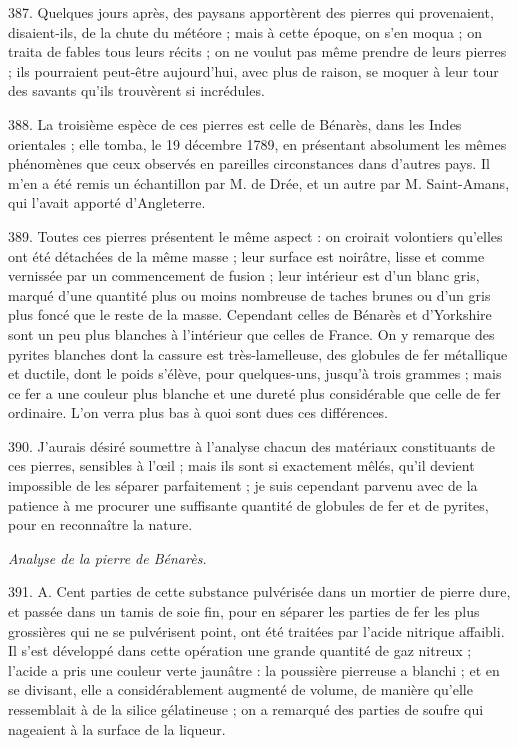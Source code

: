 \documentclass[a4paper, 11pt, oneside, polutonikogreek, french]{article}
\begin{document}
387. Quelques jours après, des paysans apportèrent des pierres qui provenaient, disaient-ils, de la chute du météore ; mais à cette époque, on s'en moqua ; on traita de fables tous leurs récits ; on ne voulut pas même prendre de leurs pierres ; ils pourraient peut-être aujourd'hui, avec plus de raison, se moquer à leur tour des savants qu'ils trouvèrent si incrédules.

388. La troisième espèce de ces pierres est celle de Bénarès, dans les Indes orientales ; elle tomba, le 19 décembre 1789, en présentant absolument les mêmes phénomènes que ceux observés en pareilles circonstances dans d'autres pays. Il m'en a été remis un échantillon par M. de Drée, et un autre par M. Saint-Amans, qui l'avait apporté d'Angleterre.

389. Toutes ces pierres présentent le même aspect : on croirait volontiers qu'elles ont été détachées de la même masse ; leur surface est noirâtre, lisse et comme vernissée par un commencement de fusion ; leur intérieur est d'un blanc gris, marqué d'une quantité plus ou moins nombreuse de taches brunes ou d'un gris plus foncé que le reste de la masse. Cependant celles de Bénarès et d'Yorkshire sont un peu plus blanches à l'intérieur que celles de France. On y remarque des pyrites blanches dont la cassure est très-lamelleuse, des globules de fer métallique et ductile, dont le poids s'élève, pour quelques-uns, jusqu'à trois grammes ; mais ce fer a une couleur plus blanche et une dureté plus considérable que celle de fer ordinaire. L'on verra plus bas à quoi sont dues ces différences.

390. J'aurais désiré soumettre à l'analyse chacun des matériaux constituants de ces pierres, sensibles à l'œil ; mais ils sont si exactement mêlés, qu'il devient impossible de les séparer parfaitement ; je suis cependant parvenu avec de la patience à me procurer une suffisante quantité de globules de fer et de pyrites, pour en reconnaître la nature.

\begin{center}
\emph{Analyse de la pierre de Bénarès.}
\end{center}

391. A. Cent parties de cette substance pulvérisée dans un mortier de pierre dure, et passée dans un tamis de soie fin, pour en séparer les parties de fer les plus grossières qui ne se pulvérisent point, ont été traitées par l'acide nitrique affaibli. Il s'est développé dans cette opération une grande quantité de gaz nitreux ; l'acide a pris une couleur verte jaunâtre : la poussière pierreuse a blanchi ; et en se divisant, elle a considérablement augmenté de volume, de manière qu'elle ressemblait à de la silice gélatineuse ; on a remarqué des parties de soufre qui nageaient à la surface de la liqueur.
\end{document}
